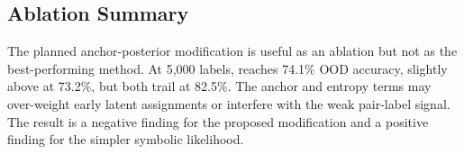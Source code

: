 \subsection{Ablation Summary}

The planned anchor-posterior modification is useful as an ablation but not as the best-performing method. At 5,000 labels, \anchorposterior reaches 74.1\% OOD accuracy, slightly above \anchorsymbolic at 73.2\%, but both trail \symbolicsum at 82.5\%. The anchor and entropy terms may over-weight early latent assignments or interfere with the weak pair-label signal. The result is a negative finding for the proposed modification and a positive finding for the simpler symbolic likelihood.
